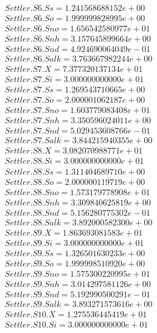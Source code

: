 \begin{align*}
    Settler.S6.Ss = 1.241568688152e+00\\
    Settler.S6.So = 1.999999828995e+00\\
    Settler.S6.Sno = 1.656542580977e+01\\
    Settler.S6.Snh = 3.157645899664e+00\\
    Settler.S6.Snd = 4.924690064049e-01\\
    Settler.S6.Salk = 3.763667982244e+00\\
    Settler.S7.X = 7.377320137134e+01\\
    Settler.S7.Si = 3.000000000000e+01\\
    Settler.S7.Ss = 1.269543710665e+00\\
    Settler.S7.So = 2.000001062187e+00\\
    Settler.S7.Sno = 1.603779083408e+01\\
    Settler.S7.Snh = 3.350596024011e+00\\
    Settler.S7.Snd = 5.029453608766e-01\\
    Settler.S7.Salk = 3.844215940355e+00\\
    Settler.S8.X = 3.082070988771e+01\\
    Settler.S8.Si = 3.000000000000e+01\\
    Settler.S8.Ss = 1.311404689710e+00\\
    Settler.S8.So = 2.000000119719e+00\\
    Settler.S8.Sno = 1.573179778908e+01\\
    Settler.S8.Snh = 3.309840625819e+00\\
    Settler.S8.Snd = 5.156280775302e-01\\
    Settler.S8.Salk = 3.892000582300e+00\\
    Settler.S9.X = 1.863693081583e+01\\
    Settler.S9.Si = 3.000000000000e+01\\
    Settler.S9.Ss = 1.326501630233e+00\\
    Settler.S9.So = 1.999998510920e+00\\
    Settler.S9.Sno = 1.575300220995e+01\\
    Settler.S9.Snh = 3.014297581126e+00\\
    Settler.S9.Snd = 5.192990500291e-01\\
    Settler.S9.Salk = 3.893271573616e+00\\
    Settler.S10.X = 1.275536445419e+01\\
    Settler.S10.Si = 3.000000000000e+01\\

\end{align*}
